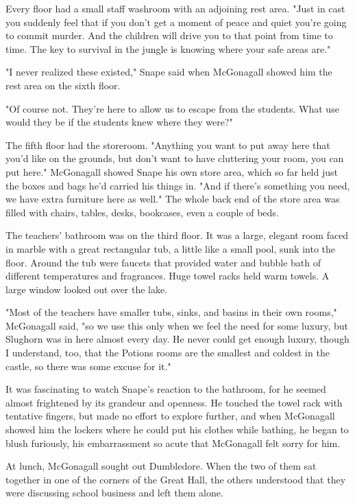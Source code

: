 \documentclass[a4paper,11pt]{article}
\begin{document}
Every floor had a small staff washroom with an adjoining rest area. "Just in cast you suddenly feel that if you don't get a moment of peace and quiet you're going to commit murder. And the children will drive you to that point from time to time. The key to survival in the jungle is knowing where your safe areas are."

"I never realized these existed," Snape said when McGonagall showed him the rest area on the sixth floor.

"Of course not. They're here to allow us to escape from the students. What use would they be if the students knew where they were?"

The fifth floor had the storeroom. "Anything you want to put away here that you'd like on the grounds, but don't want to have cluttering your room, you can put here." McGonagall showed Snape his own store area, which so far held just the boxes and bags he'd carried his things in. "And if there's something you need, we have extra furniture here as well." The whole back end of the store area was filled with chairs, tables, desks, bookcases, even a couple of beds.

The teachers' bathroom was on the third floor. It was a large, elegant room faced in marble with a great rectangular tub, a little like a small pool, sunk into the floor. Around the tub were faucets that provided water and bubble bath of different temperatures and fragrances. Huge towel racks held warm towels. A large window looked out over the lake.

"Most of the teachers have smaller tubs, sinks, and basins in their own rooms," McGonagall said, "so we use this only when we feel the need for some luxury, but Slughorn was in here almost every day. He never could get enough luxury, though I understand, too, that the Potions rooms are the smallest and coldest in the castle, so there was some excuse for it."

It was fascinating to watch Snape's reaction to the bathroom, for he seemed almost frightened by its grandeur and openness. He touched the towel rack with tentative fingers, but made no effort to explore further, and when McGonagall showed him the lockers where he could put his clothes while bathing, he began to blush furiously, his embarrassment so acute that McGonagall felt sorry for him.

At lunch, McGonagall sought out Dumbledore. When the two of them sat together in one of the corners of the Great Hall, the others understood that they were discussing school business and left them alone.
\end{document}
